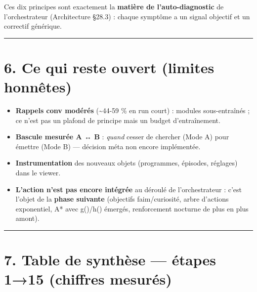 \documentclass[
  french,
  11pt,
]{article}
\providecommand{\tightlist}{%
  \setlength{\itemsep}{0pt}\setlength{\parskip}{0pt}}
\begin{document}
Ces dix principes sont exactement la \textbf{matière de
l'auto-diagnostic} de l'orchestrateur (Architecture §28.3) : chaque
symptôme a un signal objectif et un correctif générique.

\begin{center}\rule{0.5\linewidth}{0.5pt}\end{center}

\section{6. Ce qui reste ouvert (limites
honnêtes)}\label{ce-qui-reste-ouvert-limites-honnuxeates}

\begin{itemize}
\tightlist
\item
  \textbf{Rappels conv modérés} (\textasciitilde44-59 \% en run court) :
  modules sous-entraînés ; ce n'est pas un plafond de principe mais un
  budget d'entraînement.
\item
  \textbf{Bascule mesurée A ↔ B} : \emph{quand} cesser de chercher (Mode
  A) pour émettre (Mode B) --- décision méta non encore implémentée.
\item
  \textbf{Instrumentation} des nouveaux objets (programmes, épisodes,
  réglages) dans le viewer.
\item
  \textbf{L'action n'est pas encore intégrée} au déroulé de
  l'orchestrateur : c'est l'objet de la \textbf{phase suivante}
  (objectifs faim/curiosité, arbre d'actions exponentiel, A* avec
  g()/h() émergés, renforcement nocturne de plus en plus amont).
\end{itemize}

\begin{center}\rule{0.5\linewidth}{0.5pt}\end{center}

\section{7. Table de synthèse --- étapes 1→15 (chiffres
mesurés)}\label{table-de-synthuxe8se-uxe9tapes-115-chiffres-mesuruxe9s}
\end{document}
